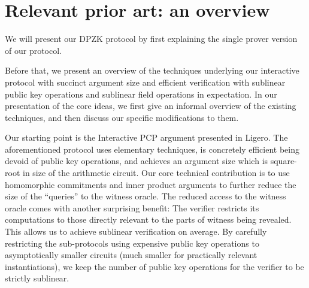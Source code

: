 \section{Relevant prior art: an overview} 
We will present our DPZK protocol \dpname{} by first explaining the single prover version of our protocol. 

Before that, we present an overview of the techniques underlying our interactive protocol
with succinct argument size and efficient verification with sublinear public
key operations and sublinear field operations in expectation. In our
presentation of the core ideas, we first give an informal overview of the
existing techniques, and then discuss our specific modifications to them.

Our starting point is the Interactive PCP argument presented in Ligero\cite{Ligero2017}. The
aforementioned protocol uses elementary techniques, is concretely
efficient being devoid of public key operations, and achieves an argument
size which is square-root in size of the arithmetic circuit. Our core technical
contribution is to use homomorphic commitments and inner product arguments to 
further reduce the size of the ``queries'' to the witness oracle. The
reduced access to the witness oracle comes with another surprising benefit: The
verifier restricts its computations to those directly relevant to the parts of
witness being revealed. This allows us to achieve sublinear verification on
average. By carefully restricting the sub-protocols using expensive public key
operations to asymptotically smaller circuits (much smaller for practically
relevant instantiations), we keep the number of public key operations for the
verifier to be strictly sublinear.
    
